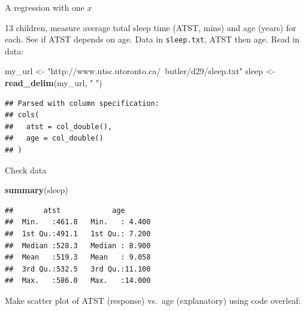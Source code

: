 \documentclass[ignorenonframetext,]{beamer}
\newenvironment{Shaded}{\begin{snugshade}}{\end{snugshade}}
\newcommand{\KeywordTok}[1]{\textcolor[rgb]{0.13,0.29,0.53}{\textbf{#1}}}
\newcommand{\NormalTok}[1]{#1}
\newcommand{\StringTok}[1]{\textcolor[rgb]{0.31,0.60,0.02}{#1}}
\begin{document}
\begin{frame}[fragile]{A regression with one \(x\)}
\protect\hypertarget{a-regression-with-one-x}{}

13 children, measure average total sleep time (ATST, mins) and age
(years) for each. See if ATST depends on age. Data in
\texttt{sleep.txt}, ATST then age. Read in data:

\begin{Shaded}
\begin{Highlighting}[]
\NormalTok{my_url <-}\StringTok{ "http://www.utsc.utoronto.ca/~butler/d29/sleep.txt"}
\NormalTok{sleep <-}\StringTok{ }\KeywordTok{read_delim}\NormalTok{(my_url, }\StringTok{" "}\NormalTok{)}
\end{Highlighting}
\end{Shaded}

\begin{verbatim}
## Parsed with column specification:
## cols(
##   atst = col_double(),
##   age = col_double()
## )
\end{verbatim}

\end{frame}

\begin{frame}[fragile]{Check data}
\protect\hypertarget{check-data}{}

\begin{Shaded}
\begin{Highlighting}[]
\KeywordTok{summary}\NormalTok{(sleep)}
\end{Highlighting}
\end{Shaded}

\begin{verbatim}
##       atst            age        
##  Min.   :461.8   Min.   : 4.400  
##  1st Qu.:491.1   1st Qu.: 7.200  
##  Median :528.3   Median : 8.900  
##  Mean   :519.3   Mean   : 9.058  
##  3rd Qu.:532.5   3rd Qu.:11.100  
##  Max.   :586.0   Max.   :14.000
\end{verbatim}

Make scatter plot of ATST (response) vs.~age (explanatory) using code
overleaf:

\end{frame}
\end{document}
